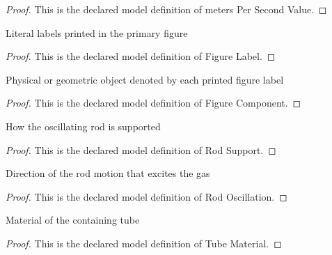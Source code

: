 \begin{proof}
  This is the declared model definition of meters Per Second Value.
\end{proof}
\begin{definition}
  \label{def:physics:phyx-mini-0328:phyxminiproblems-problemphyxmini0328-figurelabel}
  Literal labels printed in the primary figure
\end{definition}
\begin{proof}
  This is the declared model definition of Figure Label.
\end{proof}
\begin{definition}
  \label{def:physics:phyx-mini-0328:phyxminiproblems-problemphyxmini0328-figurecomponent}
  Physical or geometric object denoted by each printed figure label
\end{definition}
\begin{proof}
  This is the declared model definition of Figure Component.
\end{proof}
\begin{definition}
  \label{def:physics:phyx-mini-0328:phyxminiproblems-problemphyxmini0328-rodsupport}
  How the oscillating rod is supported
\end{definition}
\begin{proof}
  This is the declared model definition of Rod Support.
\end{proof}
\begin{definition}
  \label{def:physics:phyx-mini-0328:phyxminiproblems-problemphyxmini0328-rodoscillation}
  Direction of the rod motion that excites the gas
\end{definition}
\begin{proof}
  This is the declared model definition of Rod Oscillation.
\end{proof}
\begin{definition}
  \label{def:physics:phyx-mini-0328:phyxminiproblems-problemphyxmini0328-tubematerial}
  Material of the containing tube
\end{definition}
\begin{proof}
  This is the declared model definition of Tube Material.
\end{proof}
